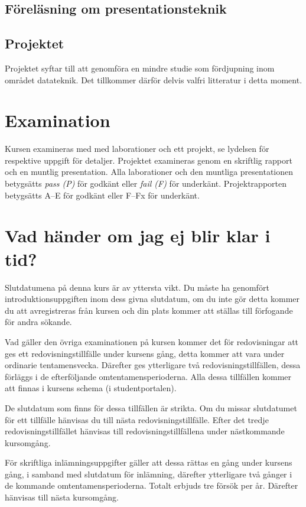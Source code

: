 \documentclass[a4paper,logo]{miunart}
\begin{document}
\subsection{Föreläsning om presentationsteknik}


\subsection{Projektet}
Projektet syftar till att genomföra en mindre studie som fördjupning inom 
området datateknik.
Det tillkommer därför delvis valfri litteratur i detta moment.


\section{Examination}
\label{sec:exam}
\noindent
Kursen examineras med med laborationer och ett projekt, se lydelsen för 
respektive uppgift för detaljer.
Projektet examineras genom en skriftlig rapport och en muntlig presentation.
Alla laborationer och den muntliga presentationen betygsätts \emph{pass (P)} 
för godkänt eller \emph{fail (F)} för underkänt.
Projektrapporten betygsätts A--E för godkänt eller F--Fx för underkänt.


\section{Vad händer om jag ej blir klar i tid?}
\label{sec:late}
\noindent
Slutdatumena på denna kurs är av yttersta vikt.
Du måste ha genomfört introduktionsuppgiften inom dess givna slutdatum, om du 
inte gör detta kommer du att avregistreras från kursen och din plats kommer att 
ställas till förfogande för andra sökande.

Vad gäller den övriga examinationen på kursen kommer det för redovisningar att 
ges ett redovisningstillfälle under kursens gång, detta kommer att vara under 
ordinarie tentamensvecka.
Därefter ges ytterligare två redovisningstillfällen, dessa förläggs i de 
efterföljande omtentamensperioderna.
Alla dessa tillfällen kommer att finnas i kursens schema (i studentportalen).

De slutdatum som finns för dessa tillfällen är strikta.
Om du missar slutdatumet för ett tillfälle hänvisas du till nästa 
redovisningstillfälle.
Efter det tredje redovisningstillfället hänvisas till redovisningstillfällena 
under nästkommande kursomgång.

För skriftliga inlämningsuppgifter gäller att dessa rättas en gång under 
kursens gång, i samband med slutdatum för inlämning, därefter ytterligare två 
gånger i de kommande omtentamensperioderna.
Totalt erbjuds tre försök per år.
Därefter hänvisas till nästa kursomgång.
\end{document}
